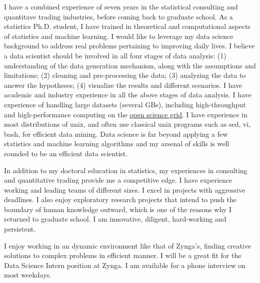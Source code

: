 \documentclass{letter} %
\begin{document}
\begin{letter}
\noindent %
I have a combined experience of seven years in the statistical consulting and quantitave trading industries, before coming back to graduate school. As a statistics Ph.D. student, I have trained in theoretical and computational aspects of statistics and machine learning. I would like to leverage my data science background to address real problems pertaining to improving daily lives. I believe a data scientist should be involved in all four stages of data analysis: (1) understanding of the data generation mechanism, along with the assumptions and limitations; (2) cleaning and pre-processing the data; (3) analyzing the data to answer the hypotheses; (4) visualize the results and different scenarios. I have academic and industry experience in all the above stages of data analysis. I have experience of handling large datasets (several GBs), including high-throughput and high-performance computing on the \href{http://www.opensciencegrid.org/}{open science grid}. I have experience in most distributions of unix, and often use classical unix programs such as sed, vi, bash, for efficient data mining. Data science is far beyond applying a few statistics and machine learning algorithms and my arsenal of skills is well rounded to be an efficient data scientist. 

In addition to my doctoral education in statistics, my experiences in consulting and quantitative trading provide me a competitive edge. I have experience working and leading teams of different sizes. I excel in projects with aggressive deadlines. I also enjoy exploratory research projects that intend to push the boundary of human knowledge outward, which is one of the reasons why I returned to graduate school. I am innovative, diligent, hard-working and persistent. 

\noindent %
I enjoy working in an dynamic environment like that of Zynga's, finding creative solutions to complex problems in efficient manner. I will be a great fit for the Data Science Intern position at Zynga. I am available for a phone interview on most weekdays. 


\end{letter}
\end{document}
